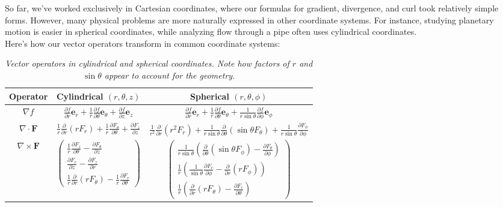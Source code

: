\noindent So far, we've worked exclusively in Cartesian coordinates, where our formulas for gradient, divergence, and curl took relatively simple forms. However, many physical problems are more naturally expressed in other coordinate systems. For instance, studying planetary motion is easier in spherical coordinates, while analyzing flow through a pipe often uses cylindrical coordinates. \\

\noindent Here's how our vector operators transform in common coordinate systems:

\begin{table}[H]
\centering
\begin{tabular}{|c|c|c|}
\hline
\textbf{Operator} & \textbf{Cylindrical} $(r,\theta,z)$ & \textbf{Spherical} $(r,\theta,\phi)$ \\
\hline
\rule{0pt}{4ex}
$\nabla f$ & $\displaystyle\frac{\partial f}{\partial r}\mathbf{e}_r + \frac{1}{r}\frac{\partial f}{\partial \theta}\mathbf{e}_\theta + \frac{\partial f}{\partial z}\mathbf{e}_z$ & $\displaystyle\frac{\partial f}{\partial r}\mathbf{e}_r + \frac{1}{r}\frac{\partial f}{\partial \theta}\mathbf{e}_\theta + \frac{1}{r\sin\theta}\frac{\partial f}{\partial \phi}\mathbf{e}_\phi$ \\[2ex]
\hline
\rule{0pt}{4ex}
$\nabla \cdot \mathbf{F}$ & $\displaystyle\frac{1}{r}\frac{\partial}{\partial r}(rF_r) + \frac{1}{r}\frac{\partial F_\theta}{\partial \theta} + \frac{\partial F_z}{\partial z}$ & $\displaystyle\frac{1}{r^2}\frac{\partial}{\partial r}(r^2F_r) + \frac{1}{r\sin\theta}\frac{\partial}{\partial \theta}(\sin\theta F_\theta) + \frac{1}{r\sin\theta}\frac{\partial F_\phi}{\partial \phi}$ \\[2ex]
\hline
\rule{0pt}{6ex}
$\nabla \times \mathbf{F}$ & $\begin{pmatrix} 
\frac{1}{r}\frac{\partial F_z}{\partial \theta} - \frac{\partial F_\theta}{\partial z} \\[1ex]
\frac{\partial F_r}{\partial z} - \frac{\partial F_z}{\partial r} \\[1ex]
\frac{1}{r}\frac{\partial}{\partial r}(rF_\theta) - \frac{1}{r}\frac{\partial F_r}{\partial \theta}
\end{pmatrix}$ & $\begin{pmatrix}
\frac{1}{r\sin\theta}\left(\frac{\partial}{\partial \theta}(\sin\theta F_\phi) - \frac{\partial F_\theta}{\partial \phi}\right) \\[1ex]
\frac{1}{r}\left(\frac{1}{\sin\theta}\frac{\partial F_r}{\partial \phi} - \frac{\partial}{\partial r}(rF_\phi)\right) \\[1ex]
\frac{1}{r}\left(\frac{\partial}{\partial r}(rF_\theta) - \frac{\partial F_r}{\partial \theta}\right)
\end{pmatrix}$ \\[6ex]
\hline
\end{tabular}
\caption{\textit{Vector operators in cylindrical and spherical coordinates. Note how factors of $r$ and $\sin\theta$ appear to account for the geometry.}}
\label{tab:coord_operators}
\end{table}

